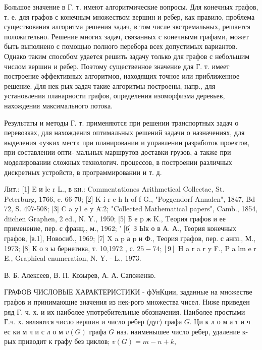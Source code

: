 \documentclass[10pt]{article}
\begin{document}
Большое значение в Г. т. имеют алгоритмические вопросы. Для конечных графов, т. е. для графов с конечным множеством вершин и ребер, как правило, проблема существования алгоритма решения задач, в том числе экстремальных, решается положительно. Решение многих задач, связанных с конечными графами, может быть выполнено с помощью полного перебора всех допустимых вариантов. Однако таким способом удается решить задачу только для графов с небольшим числом вершин и ребер. Поэтому существенное значение для Г. т. имеет построение әффективных алгоритмов, находящих точное или приближенное решение. Для нек-рых задач такие алгоритмы построены, напр., для установления планарности графов, определения изоморфизма деревьев, нахождения максимального потока.



Результаты и методы Г. т. применяются при решении транспортных задач о перевозках, для нахождения оптимальных решений задачи о назначениях, для выделения «узких мест» при планировании и управлении разработок проектов, при составлении опти- мальных маршрутов доставки грузов, а также при моделировании сложных технологич. процессов, в построении различных дискретных устройств, в программировании и т. д.



Лит.: [1] E и le r L., в кн.: Commentationes Arithmetical Collectae, St. Peterburg, 1766, c. 66-70; [2] K i r c h h of f G., "Poggendorf Annalen", 1847, Bd 72, S. 497-508; [3] C a y1 e y A.̈2; "Collected Mathematical papers", Camb., 1854, diichen Graphen, 2 ed., N. Y., 1950; [5] Б е p ж K., Tеория графов и ее применение, пер. с франц., м., 1962; ' [6] З Ык о в А. А., Теория конечных графов, [в.1], Новосиб., 1969; [7] X a p а p и Ф., Теория графов, пер. с англ., М., 1973; [8] К о з ы бернетика, т. 10,1972 , с. $25-74 ;[9]$ H a r a r y F., P a lm e r E., Graphical enumeration, N. Y. - L., 1973.



В. Б. Алексеев, В. П. Козырев, А. А. Сапоженко.



ГРАФОВ ЧИСЛОВЫЕ ХАРАКТЕРИСТИКИ - фУнКции, заданные на множестве графов и принимающие значения из нек-рого множества чисел. Ниже приведен ряд Г. ч. х. и их наиболее употребительные обозначения. Наиболее простыми Г.ч. х. являются число вершин и число ребер (дуг) графа $G$. Ци к л о м а т и ч ес ки м ч и с л о м $v(G)$ графа $G$ наз. наименышее число ребер, удаление к-рых приводит к графу без циклов; $v(G)=m-n+k$,
\end{document}

